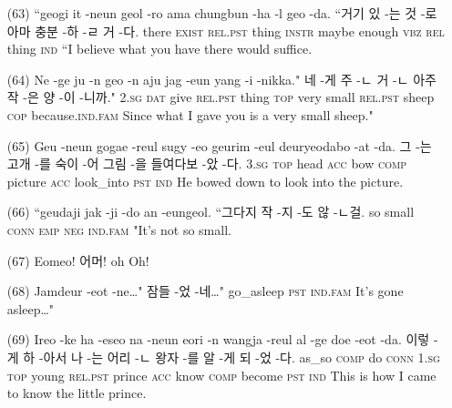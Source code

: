 \begin{itemize}
\item [(63)]
\tgl
		{``geogi it -neun geol -ro ama chungbun -ha -l geo -da.}
		{``거기 있 -는 것 -로 아마 충분 -하 -ㄹ 거 -다.}
		{there	\textsc{exist}	\textsc{rel.pst}	thing	\textsc{instr}	maybe	enough	\textsc{vbz}	\textsc{rel}	thing		\textsc{ind}}
		{``I believe what you have there would suffice.}

\item [(64)]
\tgl
		{Ne -ge ju -n geo -n aju jag -eun yang -i -nikka."}
		{네 -게 주 -ㄴ 거 -ㄴ 아주 작 -은 양 -이 -니까."}
		{\textsc{2.sg}	\textsc{dat}	give	\textsc{rel.pst}	thing	\textsc{top}	very	small	\textsc{rel.pst}	sheep	\textsc{cop}	because.\textsc{ind.fam}}
		{Since what I gave you is a very small sheep."}

\item [(65)]
\tgl
		{Geu -neun gogae -reul sugy -eo geurim -eul deuryeodabo -at -da.}
		{그 -는 고개 -를 숙이 -어 그림 -을 들여다보 -았 -다.}
		{\textsc{3.sg}	\textsc{top}	head	\textsc{acc}	bow	\textsc{comp}	picture	\textsc{acc}	look\_into	\textsc{pst}	\textsc{ind}}
		{He bowed down to look into the picture.}
		
\item [(66)]
\tgl
		{``geudaji jak -ji -do an -eungeol.}
		{``그다지 작 -지 -도 않 -ㄴ걸.}
		{so	small	\textsc{conn}	\textsc{emp}	\textsc{neg}	\textsc{ind.fam}}
		{"It's not so small.}

\item [(67)]
\tgl
		{Eomeo!}
		{어머!}
		{oh}
		{Oh!}

\item [(68)]
\tgl
		{Jamdeur -eot -ne…"}
		{잠들 -었 -네…"}
		{go\_asleep	\textsc{pst}	\textsc{ind.fam}}
		{It's gone asleep…"}

\item [(69)]
\tgl
		{Ireo -ke ha -eseo na -neun eori -n wangja -reul al -ge doe -eot -da.}
		{이렇 -게 하 -아서 나 -는 어리 -ㄴ 왕자 -를 알 -게 되 -었 -다.}
		{as\_so	\textsc{comp}	do	\textsc{conn}	\textsc{1.sg}	\textsc{top}	young	\textsc{rel.pst}	prince	\textsc{acc}	know	\textsc{comp}	become	\textsc{pst}	\textsc{ind}}
		{This is how I came to know the little prince.}
\end{itemize}

\pagebreak